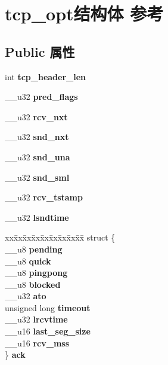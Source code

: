 \hypertarget{structtcp__opt}{}\section{tcp\+\_\+opt结构体 参考}
\label{structtcp__opt}
\subsection*{Public 属性}
\begin{DoxyCompactItemize}
\item 
\mbox{\label{structtcp__opt_a6c9c85ece159f3e417c2d30357a509a1}} 
int {\bfseries tcp\+\_\+header\+\_\+len}
\item 
\mbox{\label{structtcp__opt_ab0239e4d2ac0273d3288b3251b44e102}} 
\+\_\+\+\_\+u32 {\bfseries pred\+\_\+flags}
\item 
\mbox{\label{structtcp__opt_ace33bbcd44b26bb3d1359b0cb0833fe8}} 
\+\_\+\+\_\+u32 {\bfseries rcv\+\_\+nxt}
\item 
\mbox{\label{structtcp__opt_a5b80b1dee5ac7924ef8c9eb23ff99834}} 
\+\_\+\+\_\+u32 {\bfseries snd\+\_\+nxt}
\item 
\mbox{\label{structtcp__opt_a6c88f3bb193958b7127f2e151febcaec}} 
\+\_\+\+\_\+u32 {\bfseries snd\+\_\+una}
\item 
\mbox{\label{structtcp__opt_a3c77575834776412459dc2dd32e0c28c}} 
\+\_\+\+\_\+u32 {\bfseries snd\+\_\+sml}
\item 
\mbox{\label{structtcp__opt_ab0e1e9677e1e60a91782b8886da8bbcf}} 
\+\_\+\+\_\+u32 {\bfseries rcv\+\_\+tstamp}
\item 
\mbox{\label{structtcp__opt_acd4dda0aad7309204b023c72392adf4c}} 
\+\_\+\+\_\+u32 {\bfseries lsndtime}
\item 
\mbox{\label{structtcp__opt_af70f7f9ac5100dc8b84b14360a8bd560}} 
\begin{tabbing}
xx\=xx\=xx\=xx\=xx\=xx\=xx\=xx\=xx\=\kill
struct \{\\
\>\_\_u8 {\bfseries pending}\\
\>\_\_u8 {\bfseries quick}\\
\>\_\_u8 {\bfseries pingpong}\\
\>\_\_u8 {\bfseries blocked}\\
\>\_\_u32 {\bfseries ato}\\
\>unsigned long {\bfseries timeout}\\
\>\_\_u32 {\bfseries lrcvtime}\\
\>\_\_u16 {\bfseries last\_seg\_size}\\
\>\_\_u16 {\bfseries rcv\_mss}\\
\} {\bfseries ack}\\


\end{tabbing}
\end{DoxyCompactItemize}
